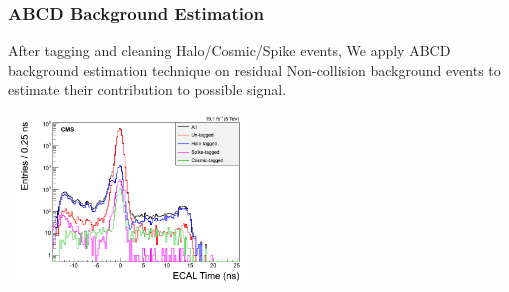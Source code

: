 \documentclass{beamer}
\begin{document}
\begin{frame}
\frametitle{ABCD Background Estimation}
\small{
After tagging and cleaning Halo/Cosmic/Spike events, We apply \alert{ABCD} background estimation technique on residual Non-collision background events to estimate their contribution to possible signal.}
\begin{tcolorbox}[colback=UNL@Cream!5,colframe=UMN@Maroon!40,title=\textcolor{UMN@Maroon}{\textbf{Event Tagging and Cleaning Performance}}]

\mbox{
 \includegraphics[height=4.5cm,width=0.99\linewidth]{THESISPLOTS/TimeForAll.png}
 } 
 \end{tcolorbox}
\end{frame}
\end{document}
